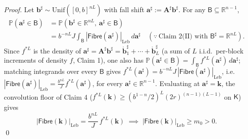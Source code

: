\documentclass[11pt]{article}
\theoremstyle{definition}
\begin{document}
\begin{proof}
\smallskip
\noindent Let $\mathbf{b}^{\sharp}\sim\mathrm{Unif}([0,b]^{nL})$ with fall shift $\mathbf{a}^{\sharp} := \mathbf{A}^{\sharp}\mathbf{b}^{\sharp}$. For any $\mathsf{B}\subseteq\mathbb{R}^{n-1}$,
\begin{align*}
\mathbb{P}(\mathbf{a}^{\sharp}\in\mathsf{B})
&= \mathbb{P}(\mathbf{b}^{\sharp}\in\mathbb{R}^{nL},\ \mathbf{a}^{\sharp}\in\mathsf{B}) \\
&= b^{-nL}J\int_{\mathsf{B}} |\mathsf{Fibre}(\mathbf{a}^{\sharp})|_{\mathrm{Leb}}\,d\mathbf{a}^{\sharp}
   \quad (\because\ \text{Claim~2(II) with } \mathsf{B}^{\sharp}=\mathbb{R}^{nL}) .
\end{align*}
Since $f^{\ast L}$ is the density of $\mathbf{a}^{\sharp}=\mathbf{A}^{\sharp}\mathbf{b}^{\sharp}=\mathring{\mathbf{b}}^{\sharp}_1+\cdots+\mathring{\mathbf{b}}^{\sharp}_L$ (a sum of $L$ i.i.d.\ per-block increments of density $f$, Claim 1), one also has $\mathbb{P}(\mathbf{a}^{\sharp}\in\mathsf{B})=\int_{\mathsf{B}} f^{\ast L}(\mathbf{a}^{\sharp})\,d\mathbf{a}^{\sharp}$; matching integrands over every $\mathsf{B}$ gives $f^{\ast L}(\mathbf{a}^{\sharp})=b^{-nL}J\,|\mathsf{Fibre}(\mathbf{a}^{\sharp})|_{\mathrm{Leb}}$, i.e.\ $|\mathsf{Fibre}(\mathbf{a}^{\sharp})|_{\mathrm{Leb}}=\tfrac{b^{nL}}{J}f^{\ast L}(\mathbf{a}^{\sharp})$, for every $\mathbf{a}^{\sharp}\in\mathbb{R}^{n-1}$. Evaluating at $\mathbf{a}^{\sharp}=\mathbf{k}$, the convolution floor of Claim 4 ($f^{\ast L}(\mathbf{k})\geq (b^{1-n}/2)^L(2r)^{(n-1)(L-1)}$ on $\mathsf{K}$) gives
\[
  |\mathsf{Fibre}(\mathbf{k})|_{\mathrm{Leb}} = \frac{b^{nL}}{J}\,f^{\ast L}(\mathbf{k}) \;\implies\; |\mathsf{Fibre}(\mathbf{k})|_{\mathrm{Leb}} \geq m_0 > 0 .
\]
\hfill\qed

\smallskip\noindent


\end{proof}
\end{document}
